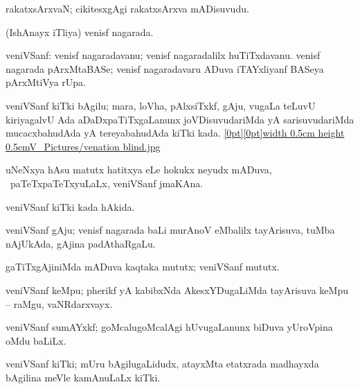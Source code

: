 \bentry
{} 
\gl{\nA}
\expl{}
\bmng
 rakatxsArxvaN; cikitesxgAgi rakatxsArxva mADisuvudu. 
\emng
\eentry

\bentry
{} 
\gl{\gu}
\expl{}
\bmng
 (IshAnayx iTliya) venisf nagarada. 
\emng
\eentry

\bentry
{} 
\gl{\nA}
\expl{}
\bmng
 veniVSanf: 
\banum
{} venisf nagaradavanu; venisf nagaradalilx huTiTxdavanu. 
 venisf nagarada pArxMtaBASe; venisf nagaradavaru ADuva iTAYxliyanf BASeya pArxMtiVya rUpa. 
  
\eanum
\emng
\eentry

\bentry
{}
\gl{\nA}
\bmng
 veniVSanf kiTki bAgilu; mara, loVha, pAlxsiTxkf, gAju, \mo vugaLa teLuvU kiriyagalvU Ada aDaDxpaTiTxgaLanunx joVDisuvudariMda yA sarisuvudariMda mucacxbahudAda yA tereyabahudAda kiTki kada. \quad \hyperlink{venation blindfigure}{\raisebox{-0.15cm}[0pt][0pt]{\pdfimage width 0.5cm height 0.5cm{V_Pictures/venation blind.jpg}}} 
\emng
\eentry

\bentry
{}
\gl{\nA}
\expl{}
\bmng
 uNeNxya hAsu matutx hatitxya eLe hokukx neyudx mADuva, \sA\ paTeTxpaTeTxyuLaLx, veniVSanf jmaKAna. 
\emng
\eentry

\bentry
{} 
\gl{\gu}
\expl{}
\bmng
 veniVSanf kiTki kada hAkida. 
\emng
\eentry

\bentry
{}
\gl{\nA}
\expl{}
\bmng
 veniVSanf gAju; venisf nagarada baLi murAnoV eMbalilx tayArisuva, tuMba nAjUkAda, gAjina padAthaRgaLu. 
\emng
\eentry

\bentry
{}
\gl{\nA}
\expl{}
\bmng
 gaTiTxgAjiniMda mADuva kaqtaka mututx; veniVSanf mututx. 
\emng
\eentry

\bentry
{}
\gl{\nA}
\expl{}
\bmng
 veniVSanf keMpu; pherikf yA kabibxNda AkesxYDugaLiMda tayArisuva keMpu -- raMgu, vaNRdarxvayx. 
\emng
\eentry

\bentry
{}
\gl{\nA}
\expl{}
\bmng
 veniVSanf sumAYxkf; goMcalugoMcalAgi hUvugaLanunx biDuva yUroVpina oMdu baLiLx. 
\emng
\eentry

\bentry
{}
\gl{\nA}
\expl{}
\bmng
 veniVSanf kiTki; mUru bAgilugaLidudx, atayxMta etatxrada madhayxda bAgilina meVle kamAnuLaLx kiTki. 
\emng
\eentry

